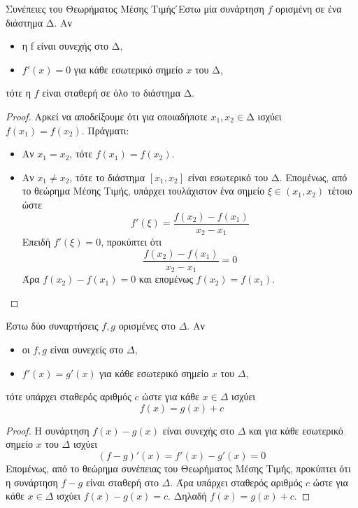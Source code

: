 \documentclass[a4paper, 12pt]{article}
\begin{document}
\begin{theorem}{Συνέπειες του Θεωρήματος Μέσης Τιμής}
  ́Εστω μία συνάρτηση $f$ ορισμένη σε ένα διάστημα $∆$. Αν
  \begin{itemize}
    \item η f είναι συνεχής στο $∆$,
    \item $f'(x)=0$ για κάθε εσωτερικό σημείο $x$ του $∆$,
  \end{itemize}
  τότε η $f$ είναι σταθερή σε όλο το διάστημα $∆$.
\end{theorem}
\begin{proof}
  Αρκεί να αποδείξουμε ότι για οποιαδήποτε $x_1,x_2\in ∆$ ισχύει $f(x_1)=f(x_2)$. Πράγματι:
  \begin{itemize}
    \item Αν $x_1=x_2$, τότε $f(x_1)=f(x_2)$.
    \item Αν $x_1\ne x_2$, τότε το διάστημα $[x_1,x_2]$ είναι εσωτερικό του $∆$. Επομένως, από το θεώρημα Μέσης Τιμής, υπάρχει τουλάχιστον ένα σημείο $ξ\in (x_1,x_2)$ τέτοιο ώστε
          $$f'(ξ)=\frac{f(x_2)-f(x_1)}{x_2-x_1}$$
          Επειδή $f'(ξ)=0$, προκύπτει ότι
          $$\frac{f(x_2)-f(x_1)}{x_2-x_1}=0$$
          Άρα $f(x_2)-f(x_1)=0$ και επομένως $f(x_2)=f(x_1)$.
  \end{itemize}
\end{proof}

\begin{theorem}{}
  Έστω δύο συναρτήσεις $f,g$ ορισμένες στο $Δ$. Αν
  \begin{itemize}
    \item οι $f,g$ είναι συνεχείς στο $Δ$,
    \item $f'(x)=g'(x)$ για κάθε εσωτερικό σημείο $x$ του $Δ$,
  \end{itemize}
  τότε υπάρχει σταθερός αριθμός $c$ ώστε για κάθε $x\in Δ$ ισχύει
  $$f(x)=g(x)+c$$
\end{theorem}
\begin{proof}
  Η συνάρτηση $f(x)-g(x)$ είναι συνεχής στο $Δ$ και για κάθε εσωτερικό σημείο $x$ του $Δ$ ισχύει
  $$\left( f-g \right)'(x)=f'(x)-g'(x)=0$$
  Επομένως, από το θεώρημα συνέπειας του Θεωρήματος Μέσης Τιμής, προκύπτει ότι η συνάρτηση $f-g$ είναι σταθερή στο $Δ$. Άρα υπάρχει σταθερός αριθμός $c$ ώστε για κάθε $x\in Δ$ ισχύει $f(x)-g(x)=c$. Δηλαδή $f(x)=g(x)+c$.
\end{proof}
\end{document}
